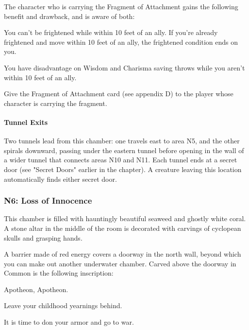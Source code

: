 \documentclass[10pt,a4paper,twoside,bg=print,twocolumn,openany,nodeprecatedcode]{dndbook}
\begin{document}
The character who is carrying the Fragment of Attachment gains the following benefit and drawback, and is aware of both:

\begin{DndComment}{}

\begin{description}[nolistsep]
\item[Benefit.]
You can't be frightened while within 10 feet of an ally. If you're already frightened and move within 10 feet of an ally, the frightened condition ends on you.
\item[Drawback.]
You have disadvantage on Wisdom and Charisma saving throws while you aren't within 10 feet of an ally.
\end{description}

\end{DndComment}

Give the Fragment of Attachment card (see appendix D) to the player whose character is carrying the fragment.

\paragraph{Tunnel Exits}
Two tunnels lead from this chamber: one travels east to area N5, and the other spirals downward, passing under the eastern tunnel before opening in the wall of a wider tunnel that connects areas N10 and N11. Each tunnel ends at a secret door (see "Secret Doors" earlier in the chapter). A creature leaving this location automatically finds either secret door.

\subsubsection{N6: Loss of Innocence}
\begin{DndReadAloud}{}
This chamber is filled with hauntingly beautiful seaweed and ghostly white coral. A stone altar in the middle of the room is decorated with carvings of cyclopean skulls and grasping hands.

A barrier made of red energy covers a doorway in the north wall, beyond which you can make out another underwater chamber. Carved above the doorway in Common is the following inscription:

Apotheon, Apotheon.

Leave your childhood yearnings behind.

It is time to don your armor and go to war.

\end{DndReadAloud}
\end{document}
